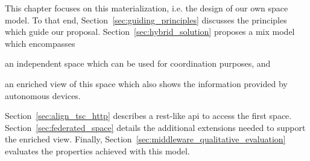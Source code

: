 This chapter focuses on this materialization, i.e. the design of our own space model.
To that end, Section~\ref{sec:guiding_principles} discusses the principles which guide our proposal.
Section~\ref{sec:hybrid_solution} proposes a mix model which encompasses
\begin{enumerate*}[label=\itshape(\alph*\upshape)]
  \item an independent space which can be used for coordination purposes, and
  \item an enriched view of this space which also shows the information provided by autonomous devices.
\end{enumerate*}
Section~\ref{sec:align_tsc_http} describes a \ac{rest}-like \ac{api} to access the first space.
Section~\ref{sec:federated_space} details the additional extensions needed to support the enriched view.
Finally, Section~\ref{sec:middleware_qualitative_evaluation} evaluates the properties achieved with this model.






